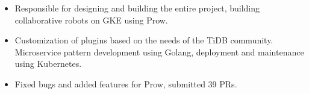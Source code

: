 \documentclass{resume}
\newcommand{\en}[1]{#1}
\newcommand{\zh}[1]{}
\begin{document}
\en{}
\zh{\datedsubsection{\textbf{\href{https://pingcap.com/zh/}{北京平凯星辰科技发展有限公司（PingCAP Inc.）}}}{2020/08 -- 现在}}
\en{}
\zh{\role{社区前后端开发工程师}{\href{https://github.com/ti-community-infra/tichi}{TiChi} 研发}}
\begin{itemize}
      \item \en{Responsible for designing and building the entire project, building collaborative robots on GKE using Prow.}
            \zh{负责设计和构建整个项目，使用 Prow 在 GKE 上搭建协作机器人。}
      \item \en{Customization of plugins based on the needs of the TiDB community. Microservice pattern development using Golang, deployment and maintenance using Kubernetes.}
            \zh{根据 TiDB 社区的需求定制化插件。使用 Golang 进行微服务模式开发，使用 Kubernetes 部署和运维。}
      \item \en{Fixed bugs and added features for Prow, submitted 39 PRs.}
            \zh{为 Prow 修复 bug 和添加功能，提交了 39 个 PR。}
\end{itemize}
\en{}
\zh{\role{数据库研发}{\href{https://github.com/pingcap/tiflow}{TiCDC} 研发工程师}}
\end{document}
